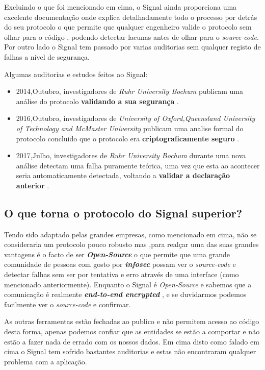 Excluindo o que foi mencionado em cima, o Signal ainda proporciona uma excelente documentação \cite{signal} onde explica detalhadamente todo o processo por detrás do seu protocolo o que permite que qualquer engenheiro valide o protocolo sem olhar para o código , podendo detectar lacunas antes de olhar para o \textit{source-code}.
Por outro lado o Signal tem passado por varias auditorias sem qualquer registo de falhas a nível de segurança.

Algumas auditorias e estudos feitos ao Signal:
\begin{itemize}
    \item 2014,Outubro, investigadores de \textit{Ruhr University Bochum} publicam uma análise do protocolo \textbf{validando a sua segurança} \cite{frosch2016secure}.
    \item 2016,Outubro, investigadores de \textit{University of Oxford,Queensland University of Technology and McMaster University} publicam uma analise formal do protocolo concluido que o protocolo era \textbf{criptograficamente seguro} \cite{cohn2017formal}.
    \item 2017,Julho, investigadores de \textit{Ruhr University Bochum} durante uma nova análise detectam uma falha puramente teórica, uma vez que esta ao acontecer seria automaticamente detectada, voltando a \textbf{validar a declaração anterior} \cite{rosler2018more}.
\end{itemize}

\subsection{O que torna o protocolo do Signal superior?}
Tendo sido adaptado pelas grandes empresas, como mencionado em cima, não se consideraria um protocolo pouco robusto mas ,para realçar uma das suas grandes vantagens é o facto de ser \textbf{\textit{Open-Source}} o que permite que uma grande comunidade de pessoas com gosto por \textit{\textbf{infosec}} possam ver o \textit{source-code} e detectar falhas sem ser por tentativa e erro através de uma interface (como mencionado anteriormente). Enquanto o Signal é \textit{Open-Source} e sabemos que a comunicação é realmente \textbf{\textit{end-to-end encrypted}} , e se duvidarmos podemos facilmente ver o \textit{source-code} e confirmar. 

As outras ferramentas estão fechadas ao publico e não permitem acesso ao código desta forma, apenas podemos confiar que as entidades se estão a comportar e não estão a fazer nada de errado com os nossos dados. Em cima disto como falado em cima o Signal tem sofrido bastantes auditorias e estas não encontraram qualquer problema com a aplicação.

